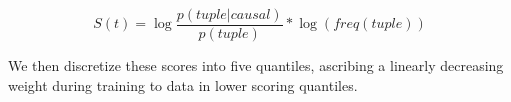 \begin{equation}
S(t) = \log \frac{p(tuple|causal)}{p(tuple)} * \log (freq(tuple))
\end{equation} 

We then discretize these scores into five quantiles, ascribing a linearly decreasing weight during training to data in lower scoring quantiles.%

